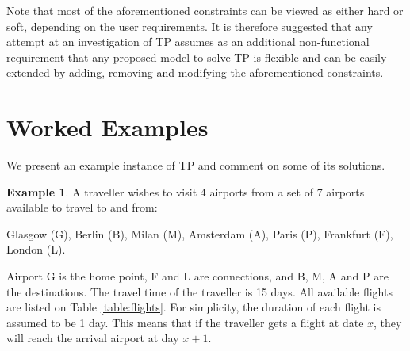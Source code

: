 \documentclass{mprop}
\theoremstyle{definition}
\newtheorem{example}{Example}
\begin{document}
Note that most of the aforementioned constraints can be viewed as either hard or soft, depending on the user requirements. It is therefore suggested that any attempt at an investigation of TP assumes as an additional non-functional requirement that any proposed model to solve TP is flexible and can be easily extended by adding, removing and modifying the aforementioned constraints.

\section{Worked Examples}
We present an example instance of TP and comment on some of its solutions.

\begin{example}
\label{example1}
A traveller wishes to visit 4 airports from a set of 7 airports available to travel to and from: 

Glasgow (G), Berlin (B), Milan (M), Amsterdam (A), Paris (P), Frankfurt (F), London (L).

Airport G is the home point, F and L are connections, and B, M, A and P are the destinations. The travel time of the traveller is 15 days. All available flights are listed on Table \ref{table:flights}. For simplicity, the duration of each flight is assumed to be 1 day. This means that if the traveller gets a flight at date $x$, they will reach the arrival airport at day $x+1$.


\end{example}
\end{document}
